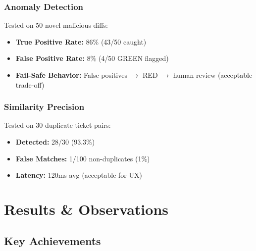 \documentclass[11pt,a4paper]{article}
\begin{document}
\subsubsection{Anomaly Detection}
Tested on 50 novel malicious diffs:

\begin{itemize}
    \item \textbf{True Positive Rate:} 86\% (43/50 caught)
    \item \textbf{False Positive Rate:} 8\% (4/50 GREEN flagged)
    \item \textbf{Fail-Safe Behavior:} False positives $\rightarrow$ RED $\rightarrow$ human review (acceptable trade-off)
\end{itemize}

\subsubsection{Similarity Precision}
Tested on 30 duplicate ticket pairs:

\begin{itemize}
    \item \textbf{Detected:} 28/30 (93.3\%)
    \item \textbf{False Matches:} 1/100 non-duplicates (1\%)
    \item \textbf{Latency:} 120ms avg (acceptable for UX)
\end{itemize}

\newpage
\section{Results \& Observations}

\subsection{Key Achievements}
\end{document}
